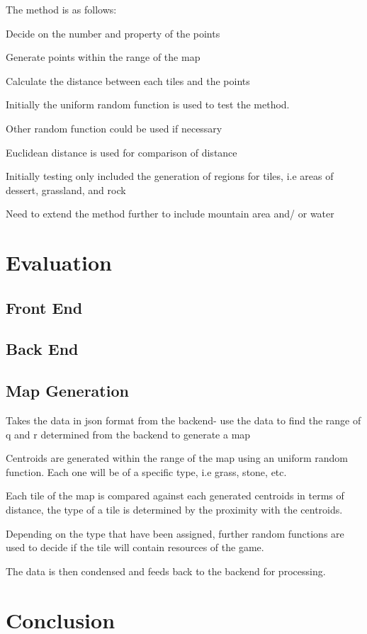 \documentclass{article}
\begin{document}
The method is as follows:

Decide on the number and property of the points

Generate points within the range of the map

Calculate the distance between each tiles and the points




Initially the uniform random function is used to test the method. 

Other random function could be used if necessary

Euclidean distance is used for comparison of distance


Initially testing only included the generation of regions for tiles, i.e areas of dessert, grassland, and rock

Need to extend the method further to include mountain area and/ or water








\section*{Evaluation}
\subsection*{Front End}
\subsection*{Back End}
\subsection*{Map Generation}

Takes the data in json format from the backend- use the data to find the range of q and r determined from the backend to generate a map

Centroids are generated within the range of the map using an uniform random function. Each one will be of a specific type, i.e grass, stone, etc. 

Each tile of the map is compared against each generated centroids in terms of distance, the type of a tile is determined by the proximity with the centroids. 

Depending on the type that have been assigned, further random functions are used to decide if the tile will contain resources of the game. 

The data is then condensed and feeds back to the backend for processing. 



\section*{Conclusion}
\end{document}
